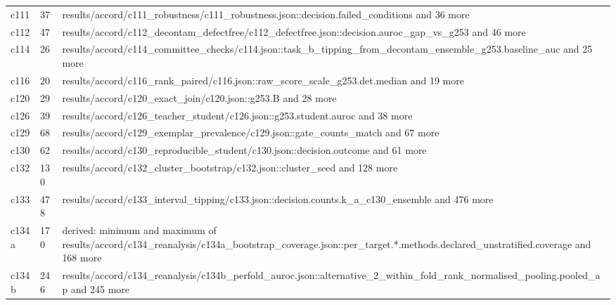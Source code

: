 \begin{longtable}{@{}p{1.6in}p{0.6in}p{3.6in}@{}}
c111 & 37 & results/\allowbreak{}accord/\allowbreak{}c111\_robustness/\allowbreak{}c111\_robustness.\allowbreak{}json::decision.\allowbreak{}failed\_conditions and 36 more\\
c112 & 47 & results/\allowbreak{}accord/\allowbreak{}c112\_decontam\_defectfree/\allowbreak{}c112\_defectfree.\allowbreak{}json::decision.\allowbreak{}auroc\_gap\_vs\_g253 and 46 more\\
c114 & 26 & results/\allowbreak{}accord/\allowbreak{}c114\_committee\_checks/\allowbreak{}c114.\allowbreak{}json::task\_b\_tipping\_from\_decontam\_ensemble\_g253.\allowbreak{}baseline\_auc and 25 more\\
c116 & 20 & results/\allowbreak{}accord/\allowbreak{}c116\_rank\_paired/\allowbreak{}c116.\allowbreak{}json::raw\_score\_scale\_g253.\allowbreak{}det.\allowbreak{}median and 19 more\\
c120 & 29 & results/\allowbreak{}accord/\allowbreak{}c120\_exact\_join/\allowbreak{}c120.\allowbreak{}json::g253.\allowbreak{}B and 28 more\\
c126 & 39 & results/\allowbreak{}accord/\allowbreak{}c126\_teacher\_student/\allowbreak{}c126.\allowbreak{}json::g253.\allowbreak{}student.\allowbreak{}auroc and 38 more\\
c129 & 68 & results/\allowbreak{}accord/\allowbreak{}c129\_exemplar\_prevalence/\allowbreak{}c129.\allowbreak{}json::gate\_counts\_match and 67 more\\
c130 & 62 & results/\allowbreak{}accord/\allowbreak{}c130\_reproducible\_student/\allowbreak{}c130.\allowbreak{}json::decision.\allowbreak{}outcome and 61 more\\
c132 & 130 & results/\allowbreak{}accord/\allowbreak{}c132\_cluster\_bootstrap/\allowbreak{}c132.\allowbreak{}json::cluster\_seed and 128 more\\
c133 & 478 & results/\allowbreak{}accord/\allowbreak{}c133\_interval\_tipping/\allowbreak{}c133.\allowbreak{}json::decision.\allowbreak{}counts.\allowbreak{}k\_a\_c130\_ensemble and 476 more\\
c134a & 170 & derived: minimum and maximum of results/\allowbreak{}accord/\allowbreak{}c134\_reanalysis/\allowbreak{}c134a\_bootstrap\_coverage.\allowbreak{}json::per\_target.\allowbreak{}*.\allowbreak{}methods.\allowbreak{}declared\_unstratified.\allowbreak{}coverage and 168 more\\
c134b & 246 & results/\allowbreak{}accord/\allowbreak{}c134\_reanalysis/\allowbreak{}c134b\_perfold\_auroc.\allowbreak{}json::alternative\_2\_within\_fold\_rank\_normalised\_pooling.\allowbreak{}pooled\_ap and 245 more\\

\end{longtable}
